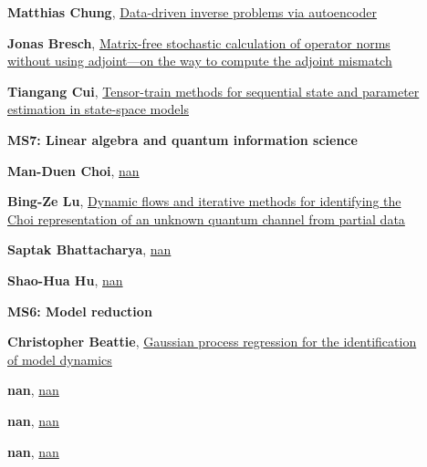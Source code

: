 \documentclass[ILAS2025-program.tex]{subfiles}
\begin{document}
\begin{description}
\begin{description}
        \item[] \hypertarget{up0202}{}\textbf{Matthias Chung}, \hyperlink{down0202}{Data-driven inverse problems via autoencoder
}
        \item[] \hypertarget{up0203}{}\textbf{Jonas Bresch}, \hyperlink{down0203}{Matrix-free stochastic calculation of operator norms without using adjoint---on the way to compute the adjoint mismatch}
        \item[] \hypertarget{up0204}{}\textbf{Tiangang Cui}, \hyperlink{down0204}{Tensor-train methods for sequential state and parameter estimation in state-space models
}
        \end{description}
    \begin{description}
    \item[] {\color{mstitle}\textbf{MS7: Linear algebra and quantum information science}} 
    \item[] \hypertarget{up0205}{}\textbf{Man-Duen Choi}, \hyperlink{down0205}{nan}
        \item[] \hypertarget{up0206}{}\textbf{Bing-Ze Lu}, \hyperlink{down0206}{Dynamic flows and iterative methods for identifying the Choi representation of an unknown quantum channel from partial data
}
        \item[] \hypertarget{up0207}{}\textbf{Saptak Bhattacharya}, \hyperlink{down0207}{nan}
        \item[] \hypertarget{up0208}{}\textbf{Shao-Hua Hu}, \hyperlink{down0208}{nan}
        \end{description}
    \begin{description}
    \item[] {\color{mstitle}\textbf{MS6: Model reduction}} 
    \item[] \hypertarget{up0209}{}\textbf{Christopher Beattie}, \hyperlink{down0209}{Gaussian process regression for the identification of model dynamics}
        \item[] \hypertarget{up0210}{}\textbf{nan}, \hyperlink{down0210}{nan}
        \item[] \hypertarget{up0211}{}\textbf{nan}, \hyperlink{down0211}{nan}
        \item[] \hypertarget{up0212}{}\textbf{nan}, \hyperlink{down0212}{nan}

\end{description}
\end{description}
\end{document}
